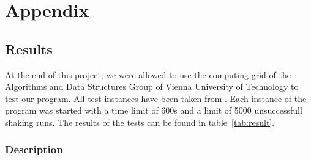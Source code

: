 \documentclass[paper = a4, fontsize = 10pt]{scrartcl}
\let\origappendix\appendix
\renewcommand\appendix{\clearpage\pagenumbering{roman}\origappendix}
\begin{document}

\appendix

\section{Appendix}

\subsection{Results}

At the end of this project, we were allowed to use the computing grid of the Algorithms and Data Structures Group of Vienna University of Technology to test our program. All test instances have been taken from \cite{Noronha2006}. Each instance of the program was started with a time limit of 600s and a limit of 5000 unsuccessfull shaking runs. The results of the tests can be found in table~\ref{tab:result}.





\subsubsection*{Description}
\end{document}
